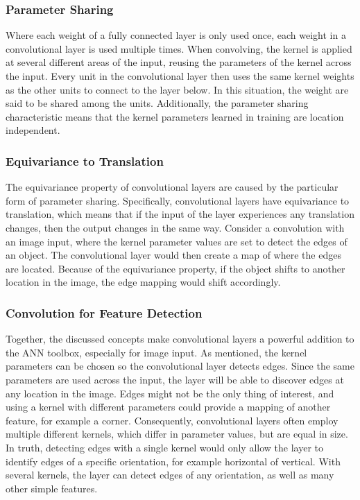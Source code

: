 \subsubsection{Parameter Sharing}

Where each weight of a fully connected layer is only used once, each weight in a convolutional layer is used multiple times. When convolving, the kernel is applied at several different areas of the input, reusing the parameters of the kernel across the input. Every unit in the convolutional layer then uses the same kernel weights as the other units to connect to the layer below. In this situation, the weight are said to be shared among the units. Additionally, the parameter sharing characteristic means that the kernel parameters learned in training are location independent.

\subsubsection{Equivariance to Translation}

The equivariance property of convolutional layers are caused by the particular form of parameter sharing. Specifically, convolutional layers have equivariance to translation, which means that if the input of the layer experiences any translation changes, then the output changes in the same way. Consider a convolution with an image input, where the kernel parameter values are set to detect the edges of an object. The convolutional layer would then create a map of where the edges are located. Because of the equivariance property, if the object shifts to another location in the image, the edge mapping would shift accordingly.

\subsubsection{Convolution for Feature Detection}

Together, the discussed concepts make convolutional layers a powerful addition to the ANN toolbox, especially for image input. As mentioned, the kernel parameters can be chosen so the convolutional layer detects edges. Since the same parameters are used across the input, the layer will be able to discover edges at any location in the image. Edges might not be the only thing of interest, and using a kernel with different parameters could provide a mapping of another feature, for example a corner. Consequently, convolutional layers often employ multiple different kernels, which differ in parameter values, but are equal in size. In truth, detecting edges with a single kernel would only allow the layer to identify edges of a specific orientation, for example horizontal of vertical. With several kernels, the layer can detect edges of any orientation, as well as many other simple features. \\

